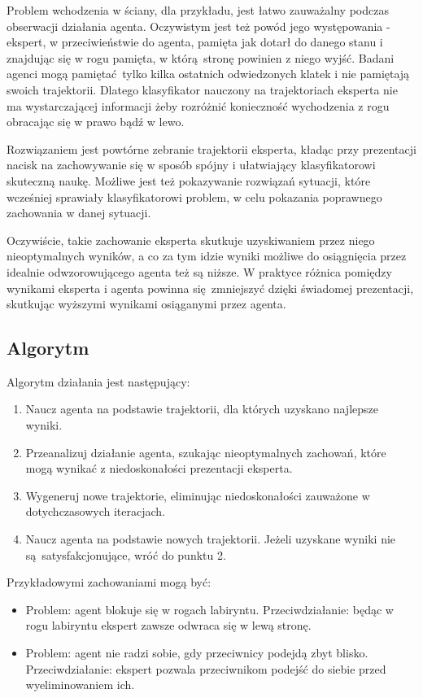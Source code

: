 \documentclass[polish,master,a4paper,oneside]{ppfcmthesis}
\begin{document}
Problem wchodzenia w ściany, dla przykładu, jest łatwo zauważalny podczas obserwacji działania agenta. Oczywistym jest też powód jego występowania - ekspert, w przeciwieństwie do agenta, pamięta jak dotarł do danego stanu i znajdując się w rogu pamięta, w którą stronę powinien z niego wyjść. Badani agenci mogą pamiętać tylko kilka ostatnich odwiedzonych klatek i nie pamiętają swoich trajektorii. Dlatego klasyfikator nauczony na trajektoriach eksperta nie ma wystarczającej informacji żeby rozróżnić konieczność wychodzenia z rogu obracając się w prawo bądź w lewo.

Rozwiązaniem jest powtórne zebranie trajektorii eksperta, kładąc przy prezentacji nacisk na zachowywanie się w sposób spójny i ułatwiający klasyfikatorowi skuteczną naukę. Możliwe jest też pokazywanie rozwiązań sytuacji, które wcześniej sprawiały klasyfikatorowi problem, w celu pokazania poprawnego zachowania w danej sytuacji.

Oczywiście, takie zachowanie eksperta skutkuje uzyskiwaniem przez niego nieoptymalnych wyników, a co za tym idzie wyniki możliwe do osiągnięcia przez idealnie odwzorowującego agenta też są niższe. W praktyce różnica pomiędzy wynikami eksperta i agenta powinna się zmniejszyć dzięki świadomej prezentacji, skutkując wyższymi wynikami osiąganymi przez agenta.

\subsection{Algorytm}

Algorytm działania jest następujący:
\begin{enumerate}
\item{Naucz agenta na podstawie trajektorii, dla których uzyskano najlepsze wyniki.}
\item{Przeanalizuj działanie agenta, szukając nieoptymalnych zachowań, które mogą wynikać z niedoskonałości prezentacji eksperta.}
\item{Wygeneruj nowe trajektorie, eliminując niedoskonałości zauważone w dotychczasowych iteracjach. }
\item{Naucz agenta na podstawie nowych trajektorii. Jeżeli uzyskane wyniki nie są satysfakcjonujące, wróć do punktu 2.}
\end{enumerate}

Przykładowymi zachowaniami mogą być:
\begin{itemize}
\item{Problem: agent blokuje się w rogach labiryntu. Przeciwdziałanie: będąc w rogu labiryntu ekspert zawsze odwraca się w lewą stronę.}
\item{Problem: agent nie radzi sobie, gdy przeciwnicy podejdą zbyt blisko. Przeciwdziałanie: ekspert pozwala przeciwnikom podejść do siebie przed wyeliminowaniem ich.}
\end{itemize}
\end{document}
